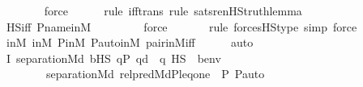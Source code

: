 \begin{isabellebody}
\ \ \ \ \ \ \isamarkupfalse%
\ force\isanewline
\ \ \ \ \ \isamarkupfalse%
{\isacharparenleft}{\kern0pt}rule\ iff{\isacharunderscore}{\kern0pt}trans{\isacharcomma}{\kern0pt}\ rule\ sats{\isacharunderscore}{\kern0pt}ren{\isacharunderscore}{\kern0pt}HS{\isacharunderscore}{\kern0pt}truth{\isacharunderscore}{\kern0pt}lemma{\isacharparenright}{\kern0pt}\isanewline
\ \ \ \ \isamarkupfalse%
\ HS{\isacharunderscore}{\kern0pt}iff\ P{\isacharunderscore}{\kern0pt}name{\isacharunderscore}{\kern0pt}in{\isacharunderscore}{\kern0pt}M\isanewline
\ \ \ \ \ \ \ \isamarkupfalse%
\ force\isanewline
\ \ \ \ \ \ \isamarkupfalse%
{\isacharparenleft}{\kern0pt}rule\ forcesHS{\isacharunderscore}{\kern0pt}type{\isacharcomma}{\kern0pt}\ simp{\isacharcomma}{\kern0pt}\ force{\isacharparenright}{\kern0pt}\isanewline
\ \ \ \ \isamarkupfalse%
\ {\isasymF}{\isacharunderscore}{\kern0pt}in{\isacharunderscore}{\kern0pt}M\ {\isasymG}{\isacharunderscore}{\kern0pt}in{\isacharunderscore}{\kern0pt}M\ P{\isacharunderscore}{\kern0pt}in{\isacharunderscore}{\kern0pt}M\ P{\isacharunderscore}{\kern0pt}auto{\isacharunderscore}{\kern0pt}in{\isacharunderscore}{\kern0pt}M\ pair{\isacharunderscore}{\kern0pt}in{\isacharunderscore}{\kern0pt}M{\isacharunderscore}{\kern0pt}iff\isanewline
\ \ \ \ \isamarkupfalse%
\ auto\isanewline
\isanewline
\ \ \isamarkupfalse%
\ I{}{\isacharcolon}{\kern0pt}\ {\isachardoublequoteopen}separation{\isacharparenleft}{\kern0pt}{\isacharhash}{\kern0pt}{\isacharhash}{\kern0pt}M{\isacharcomma}{\kern0pt}{\isasymlambda}d{\isachardot}{\kern0pt}\ {\isasymexists}b{\isasymin}HS{\isachardot}{\kern0pt}\ {\isasymforall}q{\isasymin}P{\isachardot}{\kern0pt}\ q{\isasympreceq}d\ {\isasymlongrightarrow}\ {\isasymnot}{\isacharparenleft}{\kern0pt}q\ {\isasymtturnstile}HS\ {\isasymphi}\ {\isacharparenleft}{\kern0pt}{\isacharbrackleft}{\kern0pt}b{\isacharbrackright}{\kern0pt}{\isacharat}{\kern0pt}env{\isacharparenright}{\kern0pt}{\isacharparenright}{\kern0pt}{\isacharparenright}{\kern0pt}\ {\isasymlongleftrightarrow}\ \isanewline
\ \ \ \ \ \ \ \ separation{\isacharparenleft}{\kern0pt}{\isacharhash}{\kern0pt}{\isacharhash}{\kern0pt}M{\isacharcomma}{\kern0pt}{\isasymlambda}d{\isachardot}{\kern0pt}\ {\isacharquery}{\kern0pt}rel{\isacharunderscore}{\kern0pt}pred{\isacharparenleft}{\kern0pt}M{\isacharcomma}{\kern0pt}d{\isacharcomma}{\kern0pt}P{\isacharcomma}{\kern0pt}leq{\isacharcomma}{\kern0pt}one{\isacharcomma}{\kern0pt}{\isasymlangle}{\isasymF}{\isacharcomma}{\kern0pt}\ {\isasymG}{\isacharcomma}{\kern0pt}\ P{\isacharcomma}{\kern0pt}\ P{\isacharunderscore}{\kern0pt}auto{\isasymrangle}{\isacharparenright}{\kern0pt}{\isacharparenright}{\kern0pt}{\isachardoublequoteclose}\ \isanewline

\end{isabellebody}
